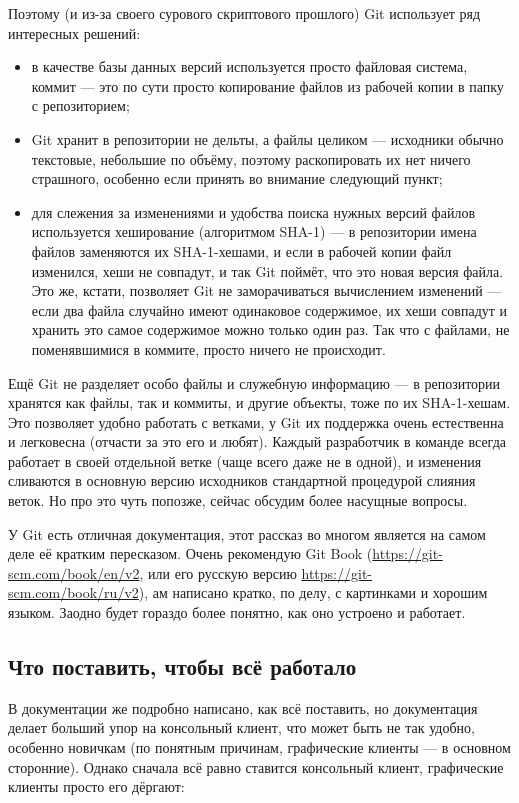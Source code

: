 \documentclass{../../text-style}
\begin{document}
Поэтому (и из-за своего сурового скриптового прошлого) Git использует ряд интересных решений:

\begin{itemize}
    \item в качестве базы данных версий используется просто файловая система, коммит --- это по сути просто копирование файлов из рабочей копии в папку с репозиторием;
    \item Git хранит в репозитории не дельты, а файлы целиком --- исходники обычно текстовые, небольшие по объёму, поэтому раскопировать их нет ничего страшного, особенно если принять во внимание следующий пункт;
    \item для слежения за изменениями и удобства поиска нужных версий файлов используется хеширование (алгоритмом SHA-1) --- в репозитории имена файлов заменяются их SHA-1-хешами, и если в рабочей копии файл изменился, хеши не совпадут, и так Git поймёт, что это новая версия файла. Это же, кстати, позволяет Git не заморачиваться вычислением изменений --- если два файла случайно имеют одинаковое содержимое, их хеши совпадут и хранить это самое содержимое можно только один раз. Так что с файлами, не поменявшимися в коммите, просто ничего не происходит.
\end{itemize}

Ещё Git не разделяет особо файлы и служебную информацию --- в репозитории хранятся как файлы, так и коммиты, и другие объекты, тоже по их SHA-1-хешам. Это позволяет удобно работать с ветками, у Git их поддержка очень естественна и легковесна (отчасти за это его и любят). Каждый разработчик в команде всегда работает в своей отдельной ветке (чаще всего даже не в одной), и изменения сливаются в основную версию исходников стандартной процедурой слияния веток. Но про это чуть попозже, сейчас обсудим более насущные вопросы.

У Git есть отличная документация, этот рассказ во многом является на самом деле её кратким пересказом. Очень рекомендую Git Book (\url{https://git-scm.com/book/en/v2}, или его русскую версию \url{https://git-scm.com/book/ru/v2}), ам написано кратко, по делу, с картинками и хорошим языком. Заодно будет гораздо более понятно, как оно устроено и работает.

\subsection{Что поставить, чтобы всё работало}

В документации же подробно написано, как всё поставить, но документация делает больший упор на консольный клиент, что может быть не так удобно, особенно новичкам (по понятным причинам, графические клиенты --- в основном сторонние). Однако сначала всё равно ставится консольный клиент, графические клиенты просто его дёргают:
\end{document}
